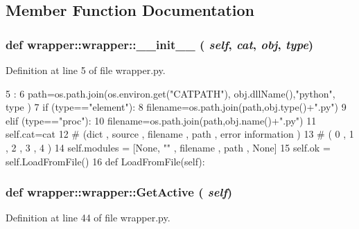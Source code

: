 \subsection{Member Function Documentation}
\hypertarget{classwrapper_1_1wrapper_a28c722c437b535f48f73fe1a9ceb7673}{
\subsubsection[{\_\-\_\-init\_\-\_\-}]{\setlength{\rightskip}{0pt plus 5cm}def wrapper::wrapper::\_\-\_\-init\_\-\_\- ( {\em self}, \/   {\em cat}, \/   {\em obj}, \/   {\em type})}}
\label{classwrapper_1_1wrapper_a28c722c437b535f48f73fe1a9ceb7673}


Definition at line 5 of file wrapper.py.


\begin{DoxyCode}
5                                       :
6         path=os.path.join(os.environ.get("CATPATH"), obj.dllName(),"python", type
      )
7         if (type=="element"):
8             filename=os.path.join(path,obj.type()+".py")
9         elif (type=="proc"):
10             filename=os.path.join(path,obj.name()+".py")
11         self.cat=cat
12         #              (dict , source ,  filename , path , error information )
13         #              (  0  ,   1    ,     2     ,    3 ,       4        )
14         self.modules =  [None,  ""    ,  filename , path ,     None]
15         self.ok = self.LoadFromFile()
16 
    def LoadFromFile(self):
\end{DoxyCode}
\hypertarget{classwrapper_1_1wrapper_ac836367c5b65afb2307339cbd5d30683}{
\subsubsection[{GetActive}]{\setlength{\rightskip}{0pt plus 5cm}def wrapper::wrapper::GetActive ( {\em self})}}
\label{classwrapper_1_1wrapper_ac836367c5b65afb2307339cbd5d30683}


Definition at line 44 of file wrapper.py.


